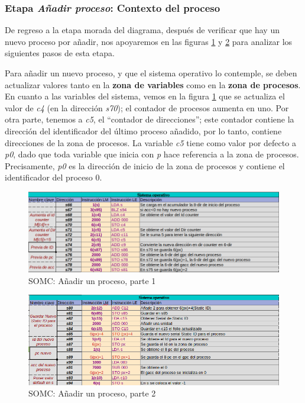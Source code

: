 \documentclass[letterpaper,12pt,oneside]{book}
\begin{document}
            \subsubsection{Etapa \textit{Añadir proceso}: Contexto del proceso}
			
			De regreso a la etapa morada del diagrama, después de verificar que hay un nuevo proceso por añadir, nos apoyaremos
			en las figuras \ref{fig:somcAddnewprocess} y \ref{fig:somcAddnewprocess2} para analizar los siguientes pasos de esta etapa. 

			Para añadir un nuevo proceso, y que el sistema operativo lo contemple, se deben actualizar valores tanto en la \textbf{zona 
			de 
			variables}
			como en la \textbf{zona de procesos}. En cuanto a las variables del sistema, vemos en la figura \ref{fig:somcAddnewprocess}
			que se actualiza el valor de \textit{c4} (en la dirección \textit{s70}); el contador
			de procesos aumenta en uno. Por otra parte, tenemos a \textit{c5}, el ``contador de direcciones''; este contador
			contiene la dirección del identificador del último proceso añadido, por lo tanto, contiene direcciones de la zona de procesos.
			La variable \textit{c5} tiene como valor por defecto a \textit{p0}, dado que toda variable que inicia con \textit{p} hace referencia a la 
			zona de 
			procesos.
			Precisamente, \textit{p0} es la dirección de inicio de la zona de procesos y contiene el identificador del proceso 0. 


		\begin{figure}[h]		
			\centering
			\includegraphics[scale=0.53]{media/CARDIACC/SO_AddNewProcess.png}
			\caption{SOMC: Añadir un proceso, parte 1}
			\label{fig:somcAddnewprocess}
		\end{figure}
		
				\begin{figure}[h]		
			\centering
			\includegraphics[scale=0.55]{media/CARDIACC/SO_AddNewProcess2.png}
			\caption{SOMC: Añadir un proceso, parte 2}
			\label{fig:somcAddnewprocess2}
		\end{figure}
			
\end{document}
